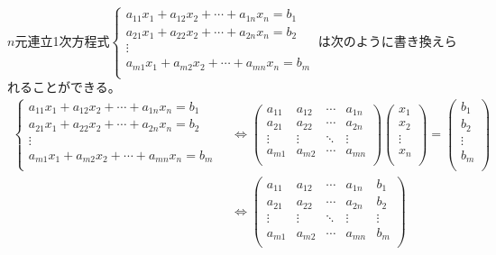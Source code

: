 \documentclass[dvipdfmx]{jsarticle}
\begin{document}
\begin{thm}\label{2.1.8.3}
$n$元連立1次方程式$\left\{ \begin{matrix}
a_{11}x_{1} + a_{12}x_{2} + \cdots + a_{1n}x_{n} = b_{1} \\
a_{21}x_{1} + a_{22}x_{2} + \cdots + a_{2n}x_{n} = b_{2} \\
 \vdots \\
a_{m1}x_{1} + a_{m2}x_{2} + \cdots + a_{mn}x_{n} = b_{m} \\
\end{matrix} \right.\ $は次のように書き換えられることができる。
\begin{align*}
\left\{ \begin{matrix}
a_{11}x_{1} + a_{12}x_{2} + \cdots + a_{1n}x_{n} = b_{1} \\
a_{21}x_{1} + a_{22}x_{2} + \cdots + a_{2n}x_{n} = b_{2} \\
 \vdots \\
a_{m1}x_{1} + a_{m2}x_{2} + \cdots + a_{mn}x_{n} = b_{m} \\
\end{matrix} \right.\  &\Leftrightarrow \begin{pmatrix}
a_{11} & a_{12} & \cdots & a_{1n} \\
a_{21} & a_{22} & \cdots & a_{2n} \\
 \vdots & \vdots & \ddots & \vdots \\
a_{m1} & a_{m2} & \cdots & a_{mn} \\
\end{pmatrix}\begin{pmatrix}
x_{1} \\
x_{2} \\
 \vdots \\
x_{n} \\
\end{pmatrix} = \begin{pmatrix}
b_{1} \\
b_{2} \\
 \vdots \\
b_{m} \\
\end{pmatrix}\\
&\Leftrightarrow \begin{pmatrix}
a_{11} & a_{12} & \cdots & a_{1n} & b_{1} \\
a_{21} & a_{22} & \cdots & a_{2n} & b_{2} \\
 \vdots & \vdots & \ddots & \vdots & \vdots \\
a_{m1} & a_{m2} & \cdots & a_{mn} & b_{m} \\

\end{pmatrix}
\end{align*}
\end{thm}
\end{document}
